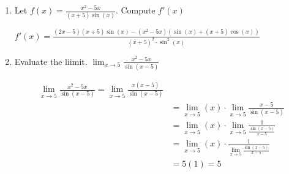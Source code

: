 \documentclass[nooutcomes,handout]{ximera}
\begin{document}

\begin{problem} \hfil

\begin{enumerate}
	\item Let $f(x)= \frac{x^2-5x}{(x+5)\sin(x)}$.  Compute $f'(x)$

	\begin{freeResponse}	
	$f'(x)= \frac{(2x-5)(x+5)\sin(x)-(x^2-5x)(\sin(x)+(x+5)\cos(x))}{(x+5)^2 \cdot\sin^2(x)}$

	\end{freeResponse}

	\item Evaluate the liimit. $\lim_{x \to 5} \frac{x^2-5x}{\sin(x-5)}$

	\begin{freeResponse}
	\begin{align*}
	\lim_{x \to 5} \frac{x^2-5x}{\sin(x-5)}=\lim_{x \to 5} \frac{x(x-5)}{\sin(x-5)}\\
	&=\lim_{x \to 5}(x) \cdot  \lim_{x \to 5}\frac{x-5}{\sin(x-5)}\\
	&=\lim_{x \to 5}(x) \cdot  \lim_{x \to 5}\frac{1}{\frac{\sin(x-5)}{x-5}}\\
	&=\lim_{x \to 5}(x) \cdot  \frac{1}{\lim_{x \to 5}\frac{\sin(x-5)}{x-5}}\\
	&= 5(1)=5
	\end{align*}
	\end{freeResponse}

\end{enumerate}
\end{problem}		
				
	
\end{document}
